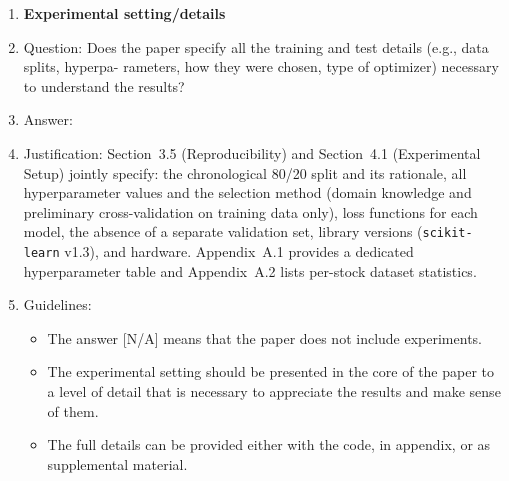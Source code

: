 \documentclass{article}
\begin{document}
\begin{enumerate}
\item {\bf Experimental setting/details}
    \item[] Question: Does the paper specify all the training and test details (e.g., data splits, hyperpa-
rameters, how they were chosen, type of optimizer) necessary to understand the results?
    \item[] Answer: \answerYes{}
    \item[] Justification: Section~3.5 (Reproducibility) and Section~4.1 (Experimental Setup)
    jointly specify: the chronological 80/20 split and its rationale, all hyperparameter values
    and the selection method (domain knowledge and preliminary cross-validation on training
    data only), loss functions for each model, the absence of a separate validation set, library
    versions (\texttt{scikit-learn} v1.3), and hardware. Appendix~A.1 provides a dedicated
    hyperparameter table and Appendix~A.2 lists per-stock dataset statistics.
    \item[] Guidelines:
    \begin{itemize}
        \item The answer [N/A] means that the paper does not include experiments.
        \item The experimental setting should be presented in the core of the paper to a level of detail
that is necessary to appreciate the results and make sense of them.
        \item The full details can be provided either with the code, in appendix, or as supplemental
material.
    \end{itemize}


\end{enumerate}
\end{document}
